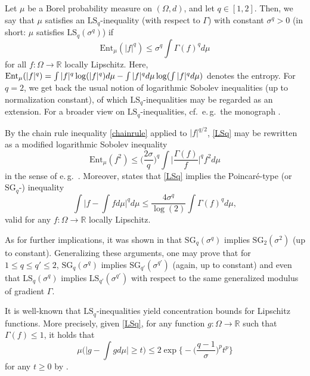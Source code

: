 \documentclass[a4paper,12pt]{amsart}
\numberwithin{equation}{section}
\theoremstyle{remark}
\def\R{{\mathbb R}}
\begin{document}
Let $\mu$ be a Borel probability measure on $(\Omega,d)$, and let $q \in [1,2]$. Then, we say that $\mu$ satisfies an $\mathrm{LS}_q$-inequality (with respect to $\Gamma$) with constant $\sigma^q > 0$ (in short: $\mu$ satisfies $\mathrm{LS}_q(\sigma^q)$) if
\begin{equation}
\label{LSq}
\mathrm{Ent}_{\mu}(|f|^q) \le \sigma^q \int \Gamma(f)^q d\mu
\end{equation}
for all $f \colon \Omega \to \R$ locally Lipschitz. Here, $\mathrm{Ent}_\mu(|f|^q) = \int |f|^q \log(|f|^q) d\mu - \int |f|^q d\mu \linebreak[2]\log(\int |f|^q d\mu)$ denotes the entropy. For $q=2$, we get back the usual notion of logarithmic Sobolev inequalities (up to normalization constant), of which $\mathrm{LS}_q$-inequalities may be regarded as an extension. For a broader view on $\mathrm{LS}_q$-inequalities, cf.\ e.\,g.\ the monograph \cite{BZ05}.

By the chain rule inequality \eqref{chainrule} applied to $|f|^{q/2}$, \eqref{LSq} may be rewritten as a modified logarithmic Sobolev inequality
\[
\mathrm{Ent}_\mu(f^2) \le \Big(\frac{2\sigma}{q}\Big)^q \int \Big|\frac{\Gamma (f)}{f}\Big|^q f^2 d\mu
\]
in the sense of e.\,g.\ \cite{ABW17}. Moreover, \cite[Th.\ 2.1]{BZ05} states that \eqref{LSq} implies the Poincar\'{e}-type (or $\mathrm{SG}_q$-) inequality
\begin{equation}
\label{SGq}
\int \Big| f - \int f d\mu \Big|^q d\mu \le \frac{4\sigma^q}{\log(2)} \int \Gamma(f)^q d\mu,
\end{equation}
valid for any $f \colon \Omega \to \R$ locally Lipschitz.

As for further implications, it was shown in \cite[Prop.\ 2.3 \& Cor.\ 2.5]{BZ05} that $\mathrm{SG}_q (\sigma^q)$ implies $\mathrm{SG}_2 (\sigma^2)$ (up to constant). Generalizing these arguments, one may prove that for $1 \le q \le q' \le 2$, $\mathrm{SG}_q(\sigma^q)$ implies $\mathrm{SG}_{q'}(\sigma^{q'})$ (again, up to constant) and even that $\mathrm{LS}_q(\sigma^q)$ implies $\mathrm{LS}_{q'}(\sigma^{q'})$ with respect to the same generalized modulus of gradient $\Gamma$.

It is well-known that $\mathrm{LS}_q$-inequalities yield concentration bounds for Lipschitz functions. More precisely, given \eqref{LSq}, for any function $g \colon \Omega \to \R$ such that $\Gamma(f) \le 1$, it holds that
\begin{equation}
\label{LipschitzLq}
    \mu\Big(\Big|g - \int g d\mu\Big| \ge t\Big) \le 2 \exp\Big\{- \Big(\frac{q-1}{\sigma}\Big)^p t^p\Big\}
\end{equation}
for any $t \ge 0$ by \cite[Th.\ 1.3]{BZ05}.
\end{document}
